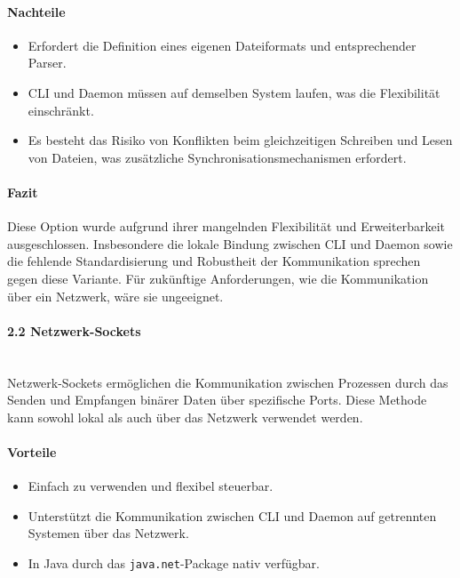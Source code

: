 \documentclass[a4paper,12pt]{report}
\begin{document}
    \paragraph*{Nachteile}
    \begin{itemize}
        \item Erfordert die Definition eines eigenen Dateiformats und entsprechender Parser.
        \item CLI und Daemon müssen auf demselben System laufen, was die Flexibilität einschränkt.
        \item Es besteht das Risiko von Konflikten beim gleichzeitigen Schreiben und Lesen von Dateien, was zusätzliche Synchronisationsmechanismen erfordert.
    \end{itemize}

    \paragraph*{Fazit}
    Diese Option wurde aufgrund ihrer mangelnden Flexibilität und Erweiterbarkeit ausgeschlossen.
    Insbesondere die lokale Bindung zwischen CLI und Daemon sowie die fehlende Standardisierung und Robustheit der Kommunikation sprechen gegen diese Variante.
    Für zukünftige Anforderungen, wie die Kommunikation über ein Netzwerk, wäre sie ungeeignet.

    \paragraph*{2.2 Netzwerk-Sockets}\mbox{}\\
    Netzwerk-Sockets ermöglichen die Kommunikation zwischen Prozessen durch das Senden und Empfangen binärer Daten über spezifische Ports.
    Diese Methode kann sowohl lokal als auch über das Netzwerk verwendet werden.

    \paragraph*{Vorteile}
    \begin{itemize}
        \item Einfach zu verwenden und flexibel steuerbar.
        \item Unterstützt die Kommunikation zwischen CLI und Daemon auf getrennten Systemen über das Netzwerk.
        \item In Java durch das \texttt{java.net}-Package nativ verfügbar.
    \end{itemize}
\end{document}
